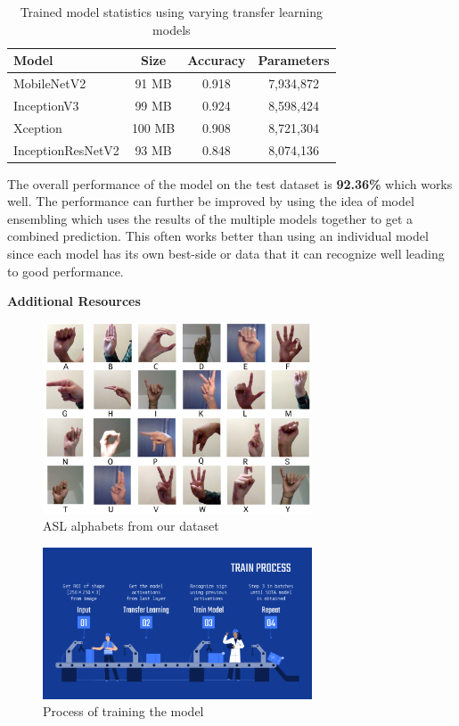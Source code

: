 \documentclass[twocolumn]{article}
\newcommand{\mobilenet}{MobileNetV2}
\newcommand{\xception}{Xception}
\newcommand{\inception}{InceptionV3}
\newcommand{\resnet}{InceptionResNetV2}
\begin{document}
\begin{table}[h]
\begin{tabular}{ |l|c|c|c| }
  \hline
  \textbf{Model} & \textbf{Size} & \textbf{Accuracy} & \textbf{Parameters} \\ \hline
  \mobilenet & 91 MB & 0.918 & 7,934,872 \\ \hline
  \inception & 99 MB & 0.924 & 8,598,424 \\ \hline
  \xception & 100 MB & 0.908 & 8,721,304 \\ \hline
  \resnet & 93 MB & 0.848 & 8,074,136 \\
  \hline
\end{tabular}
\caption{Trained model statistics using varying transfer learning models}
\end{table}

The overall performance of the model on the test dataset is \textbf{92.36\%} 
which works well. The performance can further be improved by using the idea of 
model ensembling which uses the results of the multiple models together to get 
a combined prediction. This often works better than using an individual model 
since each model has its own best-side or data that it can recognize well 
leading to good performance.





\listoffigures
\listoftables

\glsaddall
\setlength{\glsdescwidth}{0.8\textwidth}
\printglossary[type=\acronymtype,title=List Of Abbreviations]

\clearpage
\LARGE{\textbf{Additional Resources}}

\begin{figure}[h]
\centering
\includegraphics[width=8cm]{./figures/alphabets}
\caption{ASL alphabets from our dataset}
\end{figure}

\begin{figure}[h]
\centering
\includegraphics[width=8cm]{./figures/train process}
\caption{Process of training the model}
\end{figure}
\end{document}
